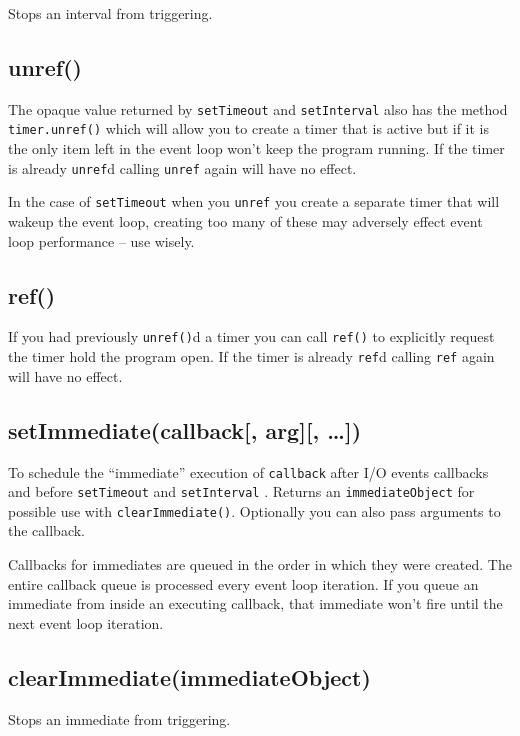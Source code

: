 Stops an interval from triggering.

\subsection{unref()}\label{unref}

The opaque value returned by \texttt{setTimeout} and
\texttt{setInterval} also has the method \texttt{timer.unref()} which
will allow you to create a timer that is active but if it is the only
item left in the event loop won't keep the program running. If the timer
is already \texttt{unref}d calling \texttt{unref} again will have no
effect.

In the case of \texttt{setTimeout} when you \texttt{unref} you create a
separate timer that will wakeup the event loop, creating too many of
these may adversely effect event loop performance -- use wisely.

\subsection{ref()}\label{ref}

If you had previously \texttt{unref()}d a timer you can call
\texttt{ref()} to explicitly request the timer hold the program open. If
the timer is already \texttt{ref}d calling \texttt{ref} again will have
no effect.

\subsection{setImmediate(callback{[}, arg{]}{[},
\ldots{}{]})}\label{setimmediatecallback-arg}

To schedule the ``immediate'' execution of \texttt{callback} after I/O
events callbacks and before \texttt{setTimeout} and \texttt{setInterval}
. Returns an \texttt{immediateObject} for possible use with
\texttt{clearImmediate()}. Optionally you can also pass arguments to the
callback.

Callbacks for immediates are queued in the order in which they were
created. The entire callback queue is processed every event loop
iteration. If you queue an immediate from inside an executing callback,
that immediate won't fire until the next event loop iteration.

\subsection{clearImmediate(immediateObject)}\label{clearimmediateimmediateobject}

Stops an immediate from triggering.
